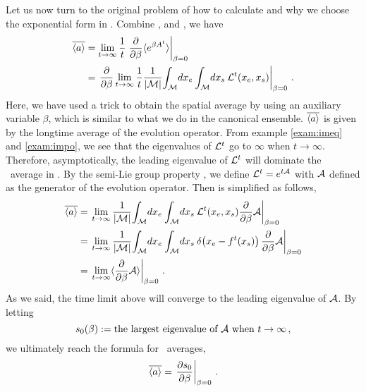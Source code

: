 Let us now turn to the original
problem of how to calculate  and why we choose the exponential
form in . Combine ,  and
, we have
\begin{align}
  \overline{\langle {a} \rangle}
  & = \lim_{t\to\infty} \frac{1}{t}
    \left. \frac{\partial}{\partial \beta} \langle {  e^{\beta A^t} } \rangle \right|_{\beta=0}
  \label{eq:aveDif1}\\
  & = \left. \frac{\partial}{\partial \beta}
     \lim_{t\to\infty} \frac{1}{t} {1 \over {|\ensuremath{\mathcal{M}}|}} {\int_{\mathcal{M}}{\!d x_e}\:}
    {\int_{\mathcal{M}}{\!d x_s}\:} \mathcal{L}^t(x_e, x_s) \right|_{\beta=0} \,.
    \label{eq:aveDif2}
\end{align}
Here, we have used a trick to obtain the spatial average by using an auxiliary variable
$\beta$, which is similar to what we do in
the canonical ensemble. $\overline{\langle {a} \rangle}$
is given by the longtime average of the evolution operator.
From example \ref{exam:imeq} and \ref{exam:impo},
we see that the eigenvalues of $\mathcal{L}^t$ go to $\infty$ when
$t\to\infty$. Therefore, asymptotically, the leading eigenvalue of
$\mathcal{L}^t$ will dominate the \spt\ average in .
By the semi-Lie group property , we define
$\mathcal{L}^t = e^{t\mathcal{A}}$ with $\mathcal{A}$ defined as the generator of the evolution operator.
Then  is simplified as follows,
\begin{align}
  \overline{\langle {a} \rangle}
  & = \left. \lim_{t\to\infty}  {1 \over {|\ensuremath{\mathcal{M}}|}} {\int_{\mathcal{M}}{\!d x_e}\:}
    {\int_{\mathcal{M}}{\!d x_s}\:} \mathcal{L}^t(x_e, x_s) \frac{\partial}{\partial \beta}
    \mathcal{A}\right|_{\beta=0}
    \label{eq:aveDif3} \\
  & = \left. \lim_{t\to\infty}  {1 \over {|\ensuremath{\mathcal{M}}|}} {\int_{\mathcal{M}}{\!d x_e}\:}
    {\int_{\mathcal{M}}{\!d x_s}\:} \delta\negthinspace\left( {x_e- {f^{t}(x_s)}} \right) \frac{\partial}{\partial \beta}
    \mathcal{A}\right|_{\beta=0}
    \label{eq:aveDif4} \\
  & = \left. \lim_{t\to\infty}
    \langle {\frac{\partial}{\partial \beta}
    \ensuremath{\mathcal{A}}} \rangle\right|_{\beta=0} \,.
\end{align}
As we said, the time limit above will converge to the leading eigenvalue of $\mathcal{A}$.
By letting
\begin{equation}
  \label{eq:s}
  s_0(\beta) := \text{the largest eigenvalue of } \mathcal{A} \text{ when } t\to\infty \,,
\end{equation}
we ultimately reach  the formula for \spt\ averages,
\begin{equation}
  \label{eq:spav}
  \overline{\langle {a} \rangle} =  \left. \frac{\partial s_0}{\partial \beta} \right|_{\beta=0}
  \,.
\end{equation}
